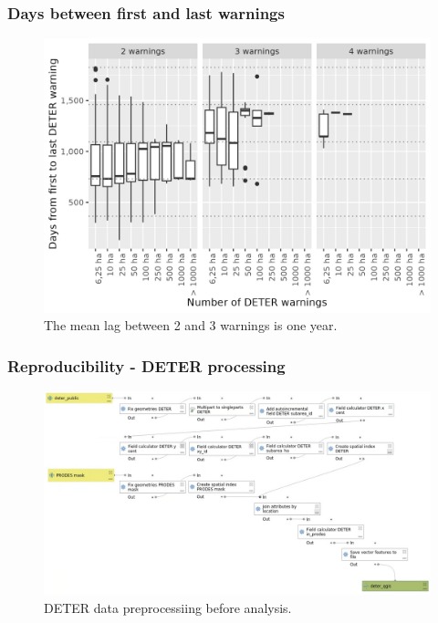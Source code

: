 \documentclass[aspectratio=169]{beamer}
\begin{document}
\begin{frame}
    \frametitle{Days between first and last warnings}
    \begin{figure}[h] 
        \includegraphics[width=0.65\linewidth]
        {./figures/plot_days_first_to_last.png}
        \caption{The mean lag between 2 and 3 warnings is one year.}
        \label{fig:deter_warning_first_to_last}
    \end{figure}
\end{frame}

\begin{frame}
    \frametitle{Reproducibility - DETER processing}
    \begin{figure}[h] 
        \includegraphics[width=0.95\linewidth] 
        {./figures/deter_processing.png}
        \caption{DETER data preprocessiing before analysis.}
        \label{fig:deter_processing}
    \end{figure}
\end{frame}
\end{document}
